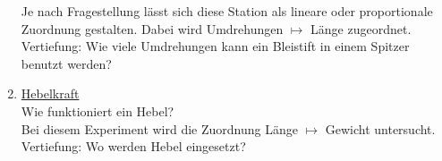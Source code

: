 \documentclass[../main.tex]{subfiles}
\begin{document}
\begin{enumerate}
        Je nach Fragestellung lässt sich diese Station als lineare oder proportionale Zuordnung gestalten. Dabei wird Umdrehungen $\mapsto$ Länge zugeordnet.\\
        \colorbox{tablegray1}{Vertiefung:} Wie viele Umdrehungen kann ein Bleistift in einem Spitzer benutzt werden?
    \item \underline{Hebelkraft}\\
        Wie funktioniert ein Hebel?\\
        Bei diesem Experiment wird die Zuordnung Länge $\mapsto$ Gewicht untersucht.\\
        \colorbox{tablegray1}{Vertiefung:} Wo werden Hebel eingesetzt?
\end{enumerate}
\end{document}
